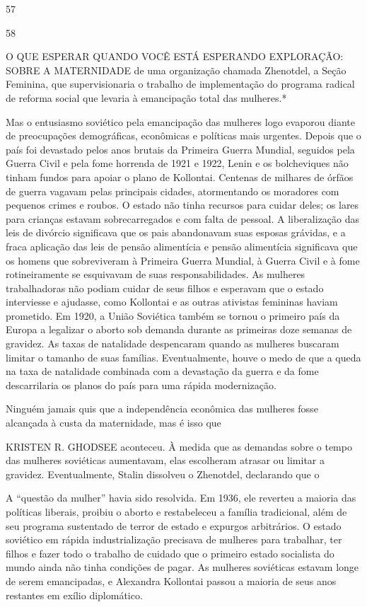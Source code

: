  \par 
57
 \par 
58
 \par 
O QUE ESPERAR QUANDO VOCÊ ESTÁ ESPERANDO EXPLORAÇÃO: SOBRE A MATERNIDADE de uma organização chamada Zhenotdel, a Seção Feminina, que supervisionaria o trabalho de implementação do programa radical de reforma social que levaria à emancipação total das mulheres.*
 \par 
Mas o entusiasmo soviético pela emancipação das mulheres logo evaporou diante de preocupações demográficas, econômicas e políticas mais urgentes. Depois que o país foi devastado pelos anos brutais da Primeira Guerra Mundial, seguidos pela Guerra Civil e pela fome horrenda de 1921 e 1922, Lenin e os bolcheviques não tinham fundos para apoiar o plano de Kollontai. Centenas de milhares de órfãos de guerra vagavam pelas principais cidades, atormentando os moradores com pequenos crimes e roubos. O estado não tinha recursos para cuidar deles; os lares para crianças estavam sobrecarregados e com falta de pessoal. A liberalização das leis de divórcio significava que os pais abandonavam suas esposas grávidas, e a fraca aplicação das leis de pensão alimentícia e pensão alimentícia significava que os homens que sobreviveram à Primeira Guerra Mundial, à Guerra Civil e à fome rotineiramente se esquivavam de suas responsabilidades. As mulheres trabalhadoras não podiam cuidar de seus filhos e esperavam que o estado interviesse e ajudasse, como Kollontai e as outras ativistas femininas haviam prometido. Em 1920, a União Soviética também se tornou o primeiro país da Europa a legalizar o aborto sob demanda durante as primeiras doze semanas de gravidez. As taxas de natalidade despencaram quando as mulheres buscaram limitar o tamanho de suas famílias. Eventualmente, houve o medo de que a queda na taxa de natalidade combinada com a devastação da guerra e da fome descarrilaria os planos do país para uma rápida modernização.
 \par 
Ninguém jamais quis que a independência econômica das mulheres fosse alcançada à custa da maternidade, mas é isso que
 \par 
KRISTEN R. GHODSEE aconteceu. À medida que as demandas sobre o tempo das mulheres soviéticas aumentavam, elas escolheram atrasar ou limitar a gravidez. Eventualmente, Stalin dissolveu o Zhenotdel, declarando que o
 \par 
A “questão da mulher” havia sido resolvida. Em 1936, ele reverteu a maioria das políticas liberais, proibiu o aborto e restabeleceu a família tradicional, além de seu programa sustentado de terror de estado e expurgos arbitrários. O estado soviético em rápida industrialização precisava de mulheres para trabalhar, ter filhos e fazer todo o trabalho de cuidado que o primeiro estado socialista do mundo ainda não tinha condições de pagar. As mulheres soviéticas estavam longe de serem emancipadas, e Alexandra Kollontai passou a maioria de seus anos restantes em exílio diplomático.
